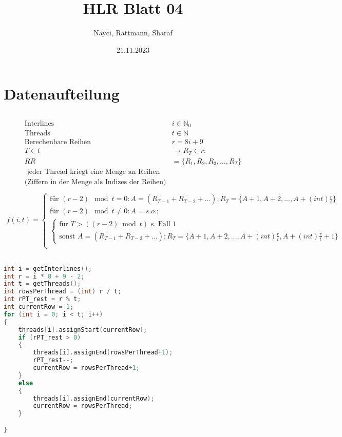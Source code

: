 \documentclass[a4paper,10pt]{article}
\title{HLR Blatt 04}
\author{Nayci, Rattmann, Sharaf}
\date{21.11.2023}
\begin{document}
\maketitle

\section{Datenaufteilung}
\subsection{}

\begin{align*}
\text{Interlines } &i \in \mathbb{N}_0\\
\text{Threads } &t \in \mathbb{N}\\
\text{Berechenbare Reihen } &r = 8i + 9 \\
T \in t &\rightarrow R_T \in r: \\
RR &= \{R_1, R_2, R_3, …, R_T\} \\
\text{ jeder Thread kriegt eine Menge an Reihen}\\
\text{(Ziffern in der Menge als Indizes der Reihen)}\\
\end{align*}
\begin{align*}
 f (i,t) = \begin{cases}
            \text{für } (r - 2)\mod t = 0: A = (\overline{R_{T-1}} + \overline{R_{T-2}} + ...);
            R_T = \{A + 1, A + 2, ..., A + (int) \frac{r}{t} \}\\
            \text{für } (r - 2)\mod t \neq 0: A = s.o.;\\
            \begin{cases}
                \text{für }  T > ((r-2) \bmod t) \text{ s. Fall 1}\\
                \text{sonst  }
                A = (\overline{R_{T-1}} + \overline{R_{T-2}} + ...);
            R_T = \{A + 1, A + 2, ..., A + (int) \frac{r}{t}, A + (int) \frac{r}{t} + 1 \}
            \end{cases}
            \\
          \end{cases}
\end{align*}


\subsection{}
\begin{lstlisting}[language=C]
int i = getInterlines();
int r = i * 8 + 9 - 2;
int t = getThreads();
int rowsPerThread = (int) r / t;
int rPT_rest = r % t;
int currentRow = 1;
for (int i = 0; i < t; i++)
{
    threads[i].assignStart(currentRow);
    if (rPT_rest > 0)
    {
        threads[i].assignEnd(rowsPerThread+1);
        rPT_rest--;
        currentRow = rowsPerThread+1;
    }
    else
    {
        threads[i].assignEnd(currentRow);
        currentRow = rowsPerThread;
    }

}
\end{lstlisting}
\subsection{}

\end{document}
